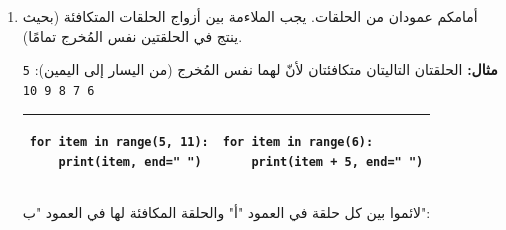\documentclass[14pt]{extarticle}
\begin{document}
\begin{enumerate}[label=\textbf{تمرين \arabic*:}, wide=0pt, itemsep=2.2em]
{\begin{longtable}{|C{1.5cm}|p{9cm}|C{4cm}|}
\hline
$8$. &
\begin{pycell}
\begin{english}
\begin{verbatim}
x = 5
i = 1
while i < 4:
    x -= 1
    i += 1
print(i, x)
\end{verbatim}
\end{english}
\end{pycell}
& \ifwithsols \begin{english}\texttt{4 2}\end{english} \fi \\
\hline
\end{longtable}}
\filbreak

\item أمامكم عمودان من الحلقات. يجب الملاءمة بين أزواج الحلقات المتكافئة (بحيث ينتج في الحلقتين نفس المُخرج تمامًا).

\textbf{مثال:} الحلقتان التاليتان متكافئتان لأنّ لهما نفس المُخرج (من اليسار إلى اليمين): \textenglish{\texttt{5 6 7 8 9 10}}

{\renewcommand{\arraystretch}{1.3}
\begin{longtable}{|p{6.5cm}|p{6.5cm}|}
\hline
\begin{pycell}
\begin{english}
\begin{verbatim}
for item in range(5, 11):
    print(item, end=" ")
\end{verbatim}
\end{english}
\end{pycell}
&
\begin{pycell}
\begin{english}
\begin{verbatim}
for item in range(6):
    print(item + 5, end=" ")
\end{verbatim}
\end{english}
\end{pycell}
\\ \hline
\end{longtable}}

لائموا بين كل حلقة في العمود "أ" والحلقة المكافئة لها في العمود "ب":


\end{enumerate}
\end{document}
